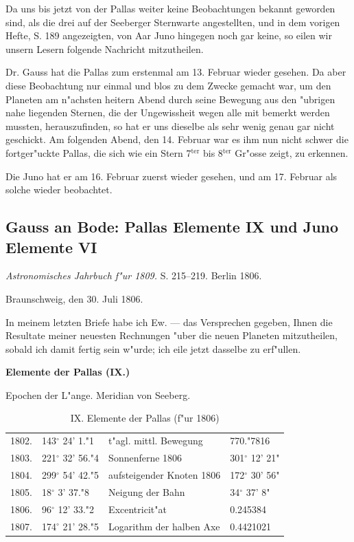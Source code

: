 \documentclass[12pt,a4paper]{article}
\begin{document}
Da uns bis jetzt von der Pallas weiter keine Beobachtungen bekannt geworden sind, als die drei auf der Seeberger Sternwarte angestellten, und in dem vorigen Hefte, S. 189 angezeigten, von Aar Juno hingegen noch gar keine, so eilen wir unsern Lesern folgende Nachricht mitzutheilen.

Dr. Gauss hat die Pallas zum erstenmal am 13. Februar wieder gesehen. Da aber diese Beobachtung nur einmal und blos zu dem Zwecke gemacht war, um den Planeten am n"achsten heitern Abend durch seine Bewegung aus den "ubrigen nahe liegenden Sternen, die der Ungewissheit wegen alle mit bemerkt werden mussten, herauszufinden, so hat er uns dieselbe als sehr wenig genau gar nicht geschickt. Am folgenden Abend, den 14. Februar war es ihm nun nicht schwer die fortger"uckte Pallas, die sich wie ein Stern 7$^\text{ter}$ bis 8$^\text{ter}$ Gr"osse zeigt, zu erkennen.

Die Juno hat er am 16. Februar zuerst wieder gesehen, und am 17. Februar als solche wieder beobachtet.

\subsection{Gauss an Bode: Pallas Elemente IX und Juno Elemente VI}

\textit{Astronomisches Jahrbuch f"ur 1809.} S. 215--219. Berlin 1806.

Braunschweig, den 30. Juli 1806.

In meinem letzten Briefe habe ich Ew. --- das Versprechen gegeben, Ihnen die Resultate meiner neuesten Rechnungen "uber die neuen Planeten mitzutheilen, sobald ich damit fertig sein w"urde; ich eile jetzt dasselbe zu erf"ullen.

\textbf{Elemente der Pallas (IX.)}

Epochen der L"ange. Meridian von Seeberg.

\begin{table}[H]
\centering
\begin{tabular}{l l | l l}
\toprule
1802. & 143$^\circ$ 24' 1."1 & t"agl. mittl. Bewegung & 770."7816 \\
1803. & 221$^\circ$ 32' 56."4 & Sonnenferne 1806 & 301$^\circ$ 12' 21" \\
1804. & 299$^\circ$ 54' 42."5 & aufsteigender Knoten 1806 & 172$^\circ$ 30' 56" \\
1805. & 18$^\circ$ 3' 37."8 & Neigung der Bahn & 34$^\circ$ 37' 8" \\
1806. & 96$^\circ$ 12' 33."2 & Excentricit"at & 0.245384 \\
1807. & 174$^\circ$ 21' 28."5 & Logarithm der halben Axe & 0.4421021 \\
\bottomrule
\end{tabular}
\caption{IX. Elemente der Pallas (f"ur 1806)}
\end{table}
\end{document}
